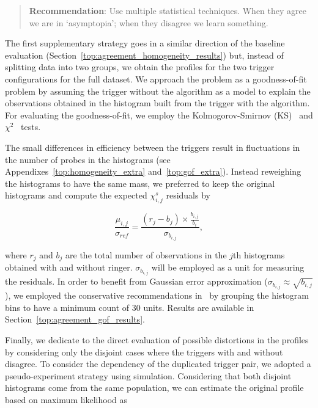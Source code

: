 \begin{quote}
\textbf{Recommendation}: Use multiple statistical techniques. When they agree
we are in ‘asymptopia’; when they disagree we learn something.
\end{quote}

The first supplementary strategy goes in a similar direction of the baseline
evaluation (Section~\ref{top:agreement_homogeneity_results}) but, instead of
splitting data into two groups, we obtain the profiles for the two trigger
configurations for the full dataset. We approach the problem as a
goodness-of-fit problem by assuming the trigger without the \rnn{} algorithm as
a model to explain the observations obtained in the histogram built from the
trigger with the \rnn{} algorithm. For evaluating the goodness-of-fit, we employ
the Kolmogorov-Smirnov (KS)~\cite{kendalls_vol1} and
$\chi^2$~\cite{guide_to_chisquared} tests.

The small differences in efficiency between the triggers result in fluctuations
in the number of probes in the histograms (see
Appendixes~\ref{top:homogeneity_extra} and~\ref{top:gof_extra}). Instead
reweighing the histograms to have the same mass, we preferred to keep the
original histograms and compute the expected $\chi_{i,j}^{s}$ residuals by

\begin{equation}
  \frac{\mu_{i,j}}{\sigma_{ref}} = \frac{\left(r_j - b_j\right) \times
  \frac{b_{i,j}}{b_i}}{\sigma_{b_{i,j}}},
  \label{eq:expected_residual}
\end{equation}

\noindent where $r_j$ and $b_j$ are the total number of observations in the
$j$th histograms obtained with and without ringer. $\sigma_{b_{i,j}}$ will be
employed as a unit for measuring the residuals. In order to benefit from
Gaussian error approximation ($\sigma_{b_{i,j}}\approx\sqrt{b_{i,j}}$), we
employed the conservative recommendations in~\cite{knoll} by grouping the
histogram bins to have a minimum count of 30 units. Results are available in
Section~\ref{top:agreement_gof_results}.

Finally, we dedicate to the direct evaluation of possible distortions in the
profiles by considering only the disjoint cases where the triggers with and
without \rnn{} disagree. To consider the dependency of the duplicated
trigger pair, we adopted a pseudo-experiment strategy using simulation.
Considering that both disjoint histograms come from the same population, we can
estimate the original profile based on maximum
likelihood as~\cite{chi_squared_comparing_hists}

